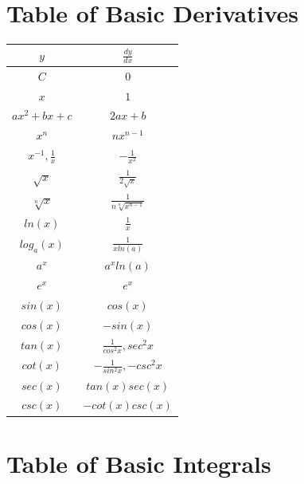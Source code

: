\documentclass[12pt, letterpaper]{article}
\begin{document}
\section{Table of Basic Derivatives}
\begin{center}
\begin{tabular}{|c|c|}
\hline
$y$ & $\frac{dy}{dx}$\\
\hline
$C$ & $0$\\
\hline
$x$ & $1$\\
\hline
$ax^2 + bx + c$ & $2ax+b$\\
\hline
$x^n$ & $nx^{n-1}$\\
\hline
$x^{-1}, \frac{1}{x}$ & $-\frac{1}{x^2}$\\
\hline
$\sqrt{x}$ & $\frac{1}{2\sqrt{x}}$\\
\hline
$\sqrt[n]{x}$ & $\frac{1}{n\sqrt[n]{x^{n-1}}}$\\
\hline
$ln(x)$ & $\frac{1}{x}$\\
\hline
$log_a (x)$ & $\frac{1}{x ln(a)}$\\
\hline
$a^x$ & $a^x ln (a)$\\
\hline
$e^x$ & $e^x$\\
\hline
$sin(x)$ & $cos(x)$\\
\hline
$cos(x)$ & $-sin(x)$\\
\hline
$tan(x)$ & $\frac{1}{cos^2 x}, sec^2 x$\\
\hline
$cot(x)$ & $-\frac{1}{sin^2 x}, -csc^2 x$\\
\hline
$sec(x)$ & $tan(x) sec(x)$\\
\hline
$csc(x)$ & $-cot(x) csc(x)$\\
\hline
\end{tabular}
\end{center}

\section{Table of Basic Integrals}
\end{document}
